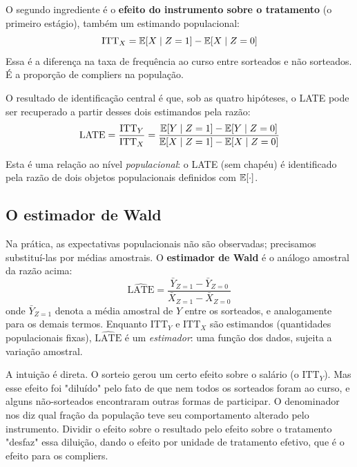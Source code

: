 O segundo ingrediente é o \textbf{efeito do instrumento sobre o tratamento} (o primeiro estágio), também um estimando populacional:
\begin{equation}
\text{ITT}_X = \mathbb{E}[X \mid Z=1] - \mathbb{E}[X \mid Z=0]
\end{equation}
Essa é a diferença na taxa de frequência ao curso entre sorteados e não sorteados. É a proporção de compliers na população.

O resultado de identificação central é que, sob as quatro hipóteses, o LATE pode ser recuperado a partir desses dois estimandos pela razão:
\begin{equation}
\text{LATE} = \frac{\text{ITT}_Y}{\text{ITT}_X} = \frac{\mathbb{E}[Y \mid Z=1] - \mathbb{E}[Y \mid Z=0]}{\mathbb{E}[X \mid Z=1] - \mathbb{E}[X \mid Z=0]}
\label{eq:late_identificacao}
\end{equation}

Esta é uma relação ao nível \textit{populacional}: o LATE (sem chapéu) é identificado pela razão de dois objetos populacionais definidos com $\mathbb{E}[\cdot]$.

\subsection*{O estimador de Wald}

Na prática, as expectativas populacionais não são observadas; precisamos substituí-las por médias amostrais. O \textbf{estimador de Wald} é o análogo amostral da razão acima:
\begin{equation}
\widehat{\text{LATE}} = \frac{\bar{Y}_{Z=1} - \bar{Y}_{Z=0}}{\bar{X}_{Z=1} - \bar{X}_{Z=0}}
\label{eq:wald}
\end{equation}
onde $\bar{Y}_{Z=1}$ denota a média amostral de $Y$ entre os sorteados, e analogamente para os demais termos. Enquanto $\text{ITT}_Y$ e $\text{ITT}_X$ são estimandos (quantidades populacionais fixas), $\widehat{\text{LATE}}$ é um \textit{estimador}: uma função dos dados, sujeita a variação amostral.

A intuição é direta. O sorteio gerou um certo efeito sobre o salário (o $\text{ITT}_Y$). Mas esse efeito foi "diluído" pelo fato de que nem todos os sorteados foram ao curso, e alguns não-sorteados encontraram outras formas de participar. O denominador nos diz qual fração da população teve seu comportamento alterado pelo instrumento. Dividir o efeito sobre o resultado pelo efeito sobre o tratamento "desfaz" essa diluição, dando o efeito por unidade de tratamento efetivo, que é o efeito para os compliers.

